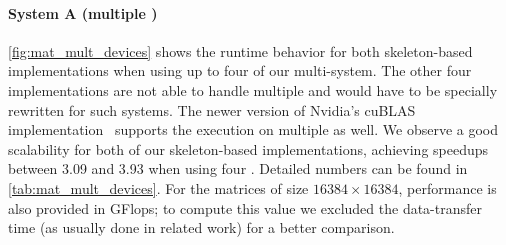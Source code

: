 \paragraph{System A (multiple \GPUs)}
\autoref{fig:mat_mult_devices} shows the runtime behavior for both \allpairs skeleton-based implementations when using up to four \GPUs of our multi-\GPU system.
The other four implementations are not able to handle multiple \GPUs and would have to be specially rewritten for such systems.
The newer version of Nvidia's cuBLAS implementation~\cite{} supports the execution on multiple \GPUs as well.
We observe a good scalability for both of our skeleton-based implementations, achieving speedups between 3.09 and 3.93 when using four \GPUs.
Detailed numbers can be found in \autoref{tab:mat_mult_devices}.
For the matrices of size $16384\times 16384$, performance is also provided in GFlops;
to compute this value we excluded the data-transfer time (as usually done in related work) for a better comparison.

\FloatBarrier
